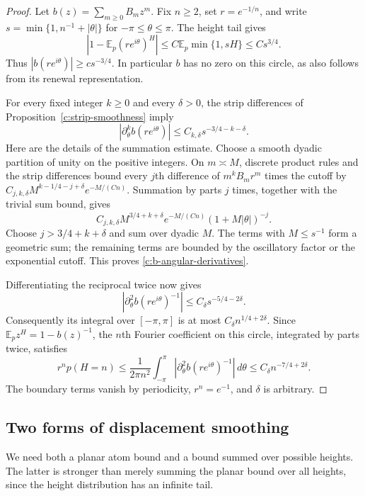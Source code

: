 \documentclass[11pt]{article}
\numberwithin{equation}{section}
\theoremstyle{definition}\newtheorem{definition}[theorem]{Definition}
\theoremstyle{remark}\newtheorem{remark}[theorem]{Remark}
\begin{document}
\begin{proof}
Let $b(z)=\sum_{m\ge0}B_mz^m$.  Fix $n\ge2$, set
$r=e^{-1/n}$, and write $s=\min\{1,n^{-1}+|\theta|\}$ for
$-\pi\le\theta\le\pi$.  The height tail gives
\[
 |1-\mathbb E_p(re^{i\theta})^H|
 \le C\mathbb E_p\min\{1,sH\}\le Cs^{3/4}.
\]
Thus $|b(re^{i\theta})|\ge cs^{-3/4}$.  In particular $b$ has no
zero on this circle, as also follows from its renewal representation.

For every fixed integer $k\ge0$ and every $\delta>0$, the strip
differences of Proposition~\ref{c:strip-smoothness} imply
\begin{equation}\label{c:b-angular-derivatives}
 \left|\partial_\theta^k b(re^{i\theta})\right|
 \le C_{k,\delta}s^{-3/4-k-\delta}.
\end{equation}
Here are the details of the summation estimate.  Choose a smooth dyadic
partition of unity on the positive integers.  On $m\asymp M$, discrete
product rules and the strip differences bound every $j$th difference of
$m^kB_mr^m$ times the cutoff by
$C_{j,k,\delta}M^{k-1/4-j+\delta}e^{-M/(Cn)}$.
Summation by parts $j$ times, together with the trivial sum bound, gives
\[
 C_{j,k,\delta}M^{3/4+k+\delta}
 e^{-M/(Cn)}(1+M|\theta|)^{-j}.
\]
Choose $j>3/4+k+\delta$ and sum over dyadic $M$.  The terms with
$M\le s^{-1}$ form a geometric sum; the remaining terms are bounded by
the oscillatory factor or the exponential cutoff.  This proves
\eqref{c:b-angular-derivatives}.

Differentiating the reciprocal twice now gives
\[
 \left|\partial_\theta^2 b(re^{i\theta})^{-1}\right|
 \le C_\delta s^{-5/4-2\delta}.
\]
Consequently its integral over $[-\pi,\pi]$ is at most
$C_\delta n^{1/4+2\delta}$.  Since
$\mathbb E_pz^H=1-b(z)^{-1}$, the $n$th Fourier coefficient on this
circle, integrated by parts twice, satisfies
\[
 r^n p(H=n)
 \le\frac1{2\pi n^2}
 \int_{-\pi}^{\pi}\left|
 \partial_\theta^2 b(re^{i\theta})^{-1}\right|\,d\theta
 \le C_\delta n^{-7/4+2\delta}.
\]
The boundary terms vanish by periodicity, $r^n=e^{-1}$, and $\delta$
is arbitrary.
\end{proof}

\subsection{Two forms of displacement smoothing}

We need both a planar atom bound and a bound summed over possible heights.
The latter is stronger than merely summing the planar bound over all
heights, since the height distribution has an infinite tail.
\end{document}
